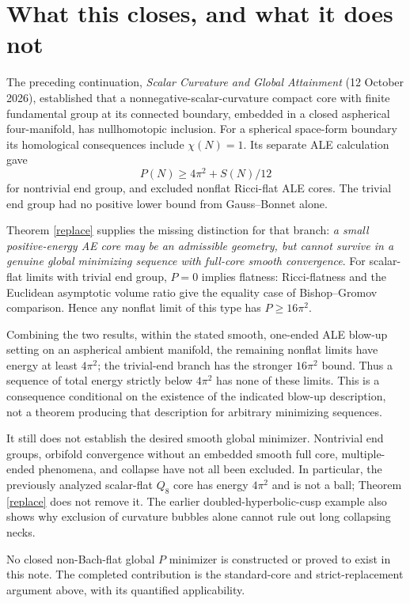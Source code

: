 \documentclass[11pt]{article}
\begin{document}
\section{What this closes, and what it does not}
The preceding continuation, \emph{Scalar Curvature and Global Attainment}
(12 October 2026), established that a nonnegative-scalar-curvature compact
core with finite fundamental group at its connected boundary, embedded in a
closed aspherical four-manifold, has nullhomotopic inclusion. For a spherical
space-form boundary its homological consequences include $\chi(N)=1$.
Its separate ALE calculation gave
\[
 P(N)\ge4\pi^2+S(N)/12
\]
for nontrivial end group, and excluded nonflat Ricci-flat ALE cores.
The trivial end group had no positive lower bound from Gauss--Bonnet alone.

Theorem \ref{replace} supplies the missing distinction for that branch:
\emph{a small positive-energy AE core may be an admissible geometry, but
cannot survive in a genuine global minimizing sequence with full-core
smooth convergence}. For scalar-flat limits with trivial end group,
$P=0$ implies flatness: Ricci-flatness and the Euclidean asymptotic volume
ratio give the equality case of Bishop--Gromov comparison. Hence any
nonflat limit of this type has $P\ge16\pi^2$.

Combining the two results, within the stated smooth, one-ended ALE
blow-up setting on an aspherical ambient manifold, the remaining nonflat
limits have energy at least $4\pi^2$; the trivial-end branch has the stronger
$16\pi^2$ bound. Thus a sequence of total energy strictly below $4\pi^2$
has none of these limits. This is a consequence conditional on the existence
of the indicated blow-up description, not a theorem producing that
description for arbitrary minimizing sequences.

It still does not establish the desired smooth global minimizer. Nontrivial
end groups, orbifold convergence without an embedded smooth full core,
multiple-ended phenomena, and collapse have not all been excluded. In
particular, the previously analyzed scalar-flat $Q_8$ core has energy
$4\pi^2$ and is not a ball; Theorem \ref{replace} does not remove it.
The earlier doubled-hyperbolic-cusp example also shows why exclusion of
curvature bubbles alone cannot rule out long collapsing necks.

No closed non-Bach-flat global $P$ minimizer is constructed or proved to
exist in this note. The completed contribution is the standard-core and
strict-replacement argument above, with its quantified applicability.
\end{document}
